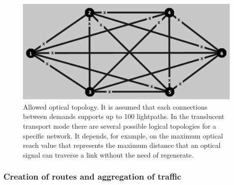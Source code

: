 \begin{figure}[H]
\centering
\includegraphics[width=13cm]{sdf/heuristic/translucent_protection/figures/allowed_optical}
\caption{Allowed optical topology. It is assumed that each connections between demands supports up to 100 lightpaths. In the translucent transport mode there are several possible logical topologies for a specific network. It depends, for example, on the maximum optical reach value that represents the maximum distance that an optical signal can traverse a link without the need of regenerate.}
\label{allowed_optical_protec_translucent}
\end{figure}

\subsubsection{Creation of routes and aggregation of traffic}

